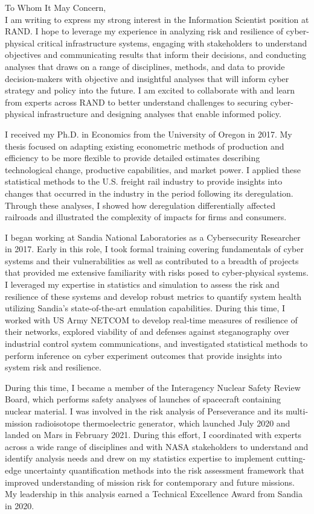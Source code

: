 \documentclass[10pt]{article}
\begin{document}
\noindent To Whom It May Concern,\\

I am writing to express my strong interest in the Information Scientist position at RAND. I hope to leverage my experience in analyzing risk and resilience of cyber-physical critical infrastructure systems, engaging with stakeholders to understand objectives and communicating results that inform their decisions, and conducting analyses that draws on a range of disciplines, methods, and data to provide decision-makers with objective and insightful analyses that will inform cyber strategy and policy into the future. I am excited to collaborate with and learn from experts across RAND to better understand challenges to securing cyber-physical infrastructure and designing analyses that enable informed policy.

I received my Ph.D. in Economics from the University of Oregon in 2017. My thesis focused on adapting existing econometric methods of production and efficiency to be more flexible to provide detailed estimates describing technological change, productive capabilities, and market power. I applied these statistical methods to the U.S. freight rail industry to provide insights into changes that occurred in the industry in the period following its deregulation. Through these analyses, I showed how deregulation differentially affected railroads and illustrated the complexity of impacts for firms and consumers. 

I began working at Sandia National Laboratories as a Cybersecurity Researcher in 2017. Early in this role, I took formal training covering fundamentals of cyber systems and their vulnerabilities as well as contributed to a breadth of projects that provided me extensive familiarity with risks posed to cyber-physical systems. I leveraged my expertise in statistics and simulation to assess the risk and resilience of these systems and develop robust metrics to quantify system health utilizing Sandia's state-of-the-art emulation capabilities. During this time, I worked with US Army NETCOM to develop real-time measures of resilience of their networks, explored viability of and defenses against steganography over industrial control system communications, and investigated statistical methods to perform inference on cyber experiment outcomes that provide insights into system risk and resilience.

During this time, I became a member of the Interagency Nuclear Safety Review Board, which performs safety analyses of launches of spacecraft containing nuclear material. I was involved in the risk analysis of Perseverance and its multi-mission radioisotope thermoelectric generator, which launched July 2020 and landed on Mars in February 2021. During this effort, I coordinated with experts across a wide range of disciplines and with NASA stakeholders to understand and identify analysis needs and drew on my statistics expertise to implement cutting-edge uncertainty quantification methods into the risk assessment framework that improved understanding of mission risk for contemporary and future missions. My leadership in this analysis earned a Technical Excellence Award from Sandia in 2020.
\end{document}
